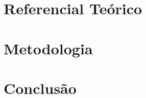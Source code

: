 \documentclass[oneside,openright,12pt]{MDT}
\author{André Vinícius Lima do Nascimento}
\begin{document}
\pretextual

\introducao{

}
\geraintro


\chapter{Referencial Teórico}


\chapter{Metodologia}


\chapter{Conclusão}




\apendice



\begin{comment}
    

 \anexo
 \chapter{Datasheet sensores utilizados}
 
\begin{figure}[H]
    \centering
    \texttt{[image: anexos e apencices/data1.pdf]}
\end{figure} 

\begin{figure}[H]
    \centering
    \texttt{[image: anexos e apencices/data2.pdf]}
\end{figure} 

\begin{figure}[H]
    \centering
    \texttt{[image: anexos e apencices/data3.pdf]}
\end{figure} 

\begin{figure}[H]
    \centering
    \texttt{[image: anexos e apencices/data4.pdf]}
\end{figure} 
\end{comment}
\end{document}
